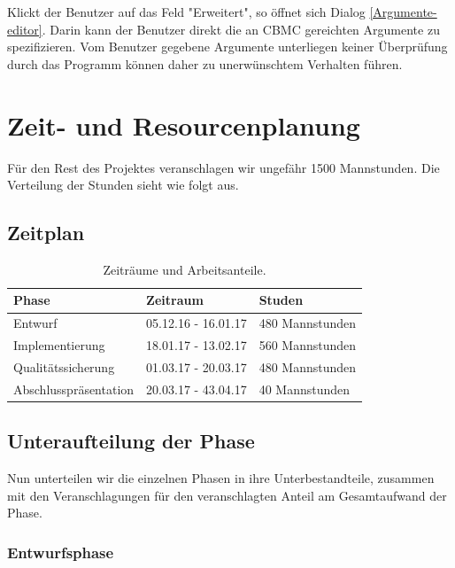 \documentclass[a4paper]{scrreprt}
\begin{document}
Klickt der \gls{Benutzer} auf das Feld "Erweitert", so öffnet sich Dialog \ref{Argumente-editor}. Darin kann der \gls{Benutzer} direkt die an \ac{CBMC} gereichten Argumente zu spezifizieren. Vom \gls{Benutzer} gegebene Argumente unterliegen keiner Überprüfung durch das Programm können daher zu unerwünschtem Verhalten führen.

\chapter{Zeit- und Resourcenplanung}

Für den Rest des Projektes veranschlagen wir ungefähr 1500 Mannstunden. Die Verteilung der Stunden sieht wie folgt aus.

\section{Zeitplan}

\begin{table}[H]
\centering
  \begin{tabular}{|p{3cm}|P{2cm}|P{2cm}|}
    Phase & Zeitraum & Studen \\ \hline
    Entwurf & 05.12.16 - 16.01.17 & 480 Mannstunden \\ \hline
    Implementierung & 18.01.17 - 13.02.17 & 560 Mannstunden \\ \hline
    Qualitätssicherung & 01.03.17 - 20.03.17 & 480 Mannstunden \\
	Abschlusspräsentation & 20.03.17 - 43.04.17 & 40 Mannstunden \\
  \end{tabular}
  \newline\newline
  \caption{Zeiträume und Arbeitsanteile.}\label{tab1}
\end{table}


\section{Unteraufteilung der Phase}
Nun unterteilen wir die einzelnen Phasen in ihre Unterbestandteile,
zusammen mit den Veranschlagungen für den veranschlagten Anteil am Gesamtaufwand der Phase.

\subsection{Entwurfsphase}
\end{document}
